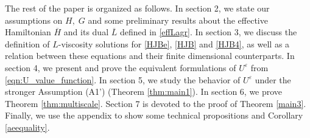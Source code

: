 \documentclass[reqno,11pt]{amsart}
\numberwithin{equation}{section}
\newcommand{\e}{\varepsilon}
\newcommand{\nd}{\noindent}
\begin{document}

    \vspace{4mm}

    \nd
    The rest of the paper is organized as follows. In section 2, we state our assumptions on $H,\; G$ and some preliminary results about the effective Hamiltonian $\overline{H}$ and its dual $\overline{L}$ defined in \eqref{effLagr}. In section 3, we discuss the definition of $L$-viscosity solutions for \eqref{HJBe}, \eqref{HJB} and \eqref{HJB4}, as well as a relation between these equations and their finite dimensional counterparts. In section 4, we present and prove the equivalent formulations of $U^\e$ from \eqref{eqn:U_value_function}. In section 5, we study the behavior of $U^\e$ under the stronger Assumption (A1') (Theorem \ref{thm:main1}). In section 6, we prove Theorem \ref{thm:multiscale}. Section 7 is devoted to the proof of Theorem \ref{main3}. Finally, we use the appendix to show some technical propositions and Corollary \ref{aeequality}.


\end{document}
